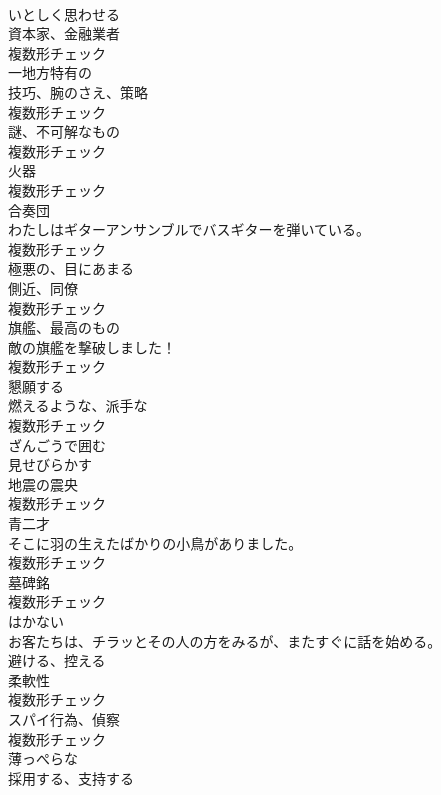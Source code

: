 \documentclass[8pt]{extreport}
\begin{document}
\begin{CJK}{UTF8}{min}
\\	[動詞]	いとしく思わせる	
\\	[名詞]	資本家、金融業者	
\\	複数形チェック
\\	[形容詞]	一地方特有の	
\\	[名詞]	技巧、腕のさえ、策略	
\\	複数形チェック
\\	[名詞]	謎、不可解なもの	
\\	複数形チェック
\\	[名詞]	火器	
\\	複数形チェック
\\	[名詞]	合奏団	
\\	わたしはギターアンサンブルでバスギターを弾いている。	
\\	複数形チェック
\\	[形容詞]	極悪の、目にあまる	
\\	[名詞]	側近、同僚	
\\	複数形チェック
\\	[名詞]	旗艦、最高のもの	
\\	敵の旗艦を撃破しました！	
\\	複数形チェック
\\	[動詞]	懇願する	
\\	[名詞]	燃えるような、派手な	
\\	複数形チェック
\\	[動詞]	ざんごうで囲む	
\\	[動詞]	見せびらかす	
\\	[名詞]	地震の震央	
\\	複数形チェック
\\	[名詞]	⻘二才	
\\	そこに羽の生えたばかりの小鳥がありました。	
\\	複数形チェック
\\	[名詞]	墓碑銘	
\\	複数形チェック
\\	[形容詞]	はかない	
\\	お客たちは、チラッとその人の方をみるが、またすぐに話を始める。	
\\	[動詞]	避ける、控える	
\\	[名詞]	柔軟性	
\\	複数形チェック
\\	[名詞]	スパイ行為、偵察	
\\	複数形チェック
\\	[形容詞]	薄っぺらな	
\\	[動詞]	採用する、支持する	

\end{CJK}
\end{document}
